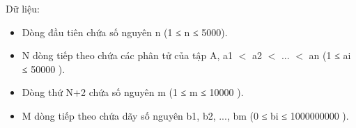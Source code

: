Dữ liệu:
\begin{itemize}
	\item     Dòng đầu tiên chứa số nguyên n (1 ≤ n ≤ 5000).   
	\item     N dòng tiếp theo chứa các phân tử của tập A, a1 $<$ a2 $<$ ... $<$ an  (1  ≤ ai  ≤ 50000 ).   
	\item     Dòng thứ N+2 chứa số nguyên m (1 ≤ m ≤ 10000 ).   
	\item     M dòng tiếp theo chứa dãy số nguyên b1, b2, ..., bm (0 ≤ bi ≤ 1000000000 ).   
\end{itemize}